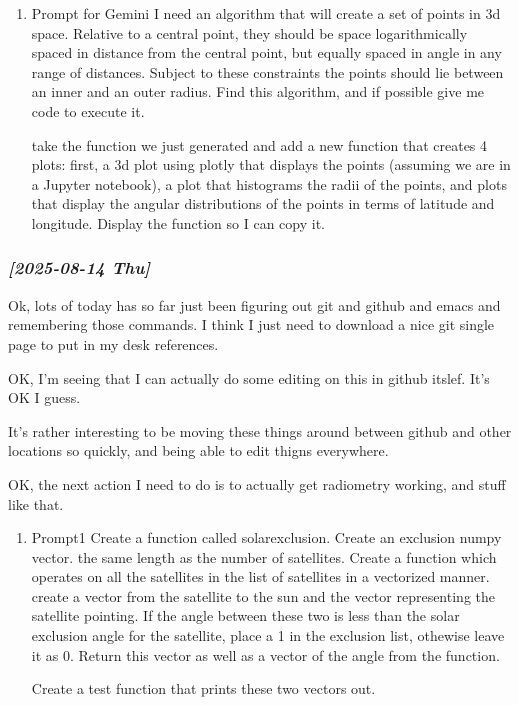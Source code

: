 \documentclass[11pt]{article}
\begin{document}
\begin{enumerate}
\item Prompt for Gemini
\label{sec:orge3fe41d}
I need an algorithm that will create a set of points in 3d space.
Relative to a central point, they should be space logarithmically
spaced in distance from the central point, but equally spaced in
angle in any range of distances. Subject to these constraints the
points should lie between an inner and an outer radius. Find this
algorithm, and if possible give me code to execute it.

take the function we just generated and add a new function that creates
4 plots: first, a 3d plot using plotly that displays the points
(assuming we are in a Jupyter notebook), a plot that histograms the
radii of the points, and plots that display the angular distributions
of the points in terms of latitude and longitude. Display the function
so I can copy it.
\end{enumerate}

\subsubsection{\textit{[2025-08-14 Thu]}}
\label{sec:orgc5af829}
Ok, lots of today has so far just been figuring out git and github and
emacs and remembering those commands.  I think I just need to download
a nice git single page to put in my desk references.


OK, I'm seeing that I can actually do some editing on this in github 
itslef.  It's OK I guess.  

It's rather interesting to be moving these things around between github
and other locations so quickly, and being able to edit thigns everywhere.

OK, the next action I need to do is to actually get radiometry working,
and stuff like that. 

\begin{enumerate}
\item Prompt1
\label{sec:orgd71559d}
Create a function called solarexclusion.
Create an exclusion numpy vector. the same length as the number of
satellites.
Create a function which operates on all the satellites in
the list of satellites in a vectorized manner.
create a vector from the satellite to the sun and the vector
representing the satellite pointing.  If the angle between these
two is less than the solar exclusion angle for the satellite,
place a 1 in the exclusion list, othewise leave it as 0.
Return this vector as well as a vector of the angle from
the function.

Create a test function that prints these two vectors out.
\end{enumerate}
\end{document}
